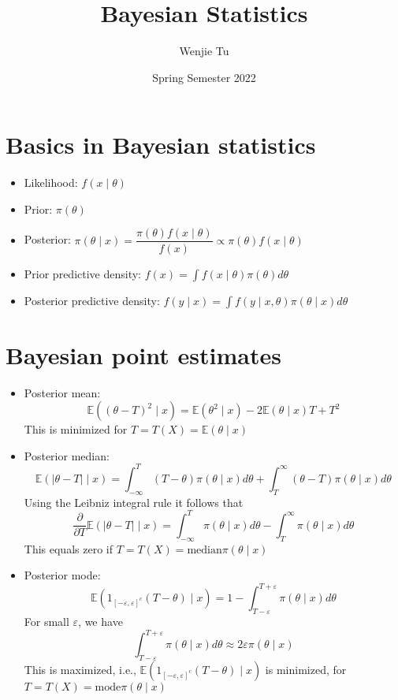 \documentclass[a4paper]{article}
\title{%
    Bayesian Statistics
}
\author{Wenjie Tu}
\date{Spring Semester 2022}
\begin{document}
\maketitle

\section*{Basics in Bayesian statistics}

\begin{itemize}
    \item Likelihood: $f(x\mid\theta)$
    \item Prior: $\pi(\theta)$
    \item Posterior: $\pi(\theta\mid x)=\dfrac{\pi(\theta)f(x\mid\theta)}{f(x)}\propto\pi(\theta)f(x\mid\theta)$
    \item Prior predictive density: $f(x)=\int f(x\mid\theta)\pi(\theta)d\theta$
    \item Posterior predictive density: $f(y\mid x)=\int f(y\mid x,\theta)\pi(\theta\mid x)d\theta$
\end{itemize}

\section*{Bayesian point estimates}

\begin{itemize}
    \item Posterior mean:
    \[\mathbb{E}((\theta-T)^2\mid x)=\mathbb{E}(\theta^2\mid x)-2\mathbb{E}(\theta\mid x)T+T^2 \]
    This is minimized for $T=T(X)=\mathbb{E}(\theta\mid x)$
    \item Posterior median:
    \[\mathbb{E}(\lvert\theta-T\rvert\mid x)=\int_{-\infty}^{T}(T-\theta)\pi(\theta\mid x)d\theta+
    \int_{T}^{\infty}(\theta-T)\pi(\theta\mid x)d\theta \]
    Using the Leibniz integral rule it follows that
    \[\frac{\partial}{\partial T}\mathbb{E}(\lvert\theta-T\rvert\mid x)=
    \int_{-\infty}^{T}\pi(\theta\mid x)d\theta-\int_{T}^{\infty}\pi(\theta\mid x)d\theta \]
    This equals zero if $T=T(X)=\text{median} \pi(\theta\mid x)$ 
    \item Posterior mode:
    \[\mathbb{E}(1_{[-\varepsilon,\varepsilon]^{c}}(T-\theta)\mid x)=
    1-\int_{T-\varepsilon}^{T+\varepsilon}\pi(\theta\mid x)d\theta \]
    For small $\varepsilon$, we have
    \[\int_{T-\varepsilon}^{T+\varepsilon}\pi(\theta\mid x)d\theta\approx2\varepsilon\pi(\theta\mid x) \]
    This is maximized, i.e., $\mathbb{E}(1_{[-\varepsilon,\varepsilon]^{c}}(T-\theta)\mid x)$ is minimized, for $T=T(X)=\text{mode}\pi(\theta\mid x)$
\end{itemize}
\end{document}
